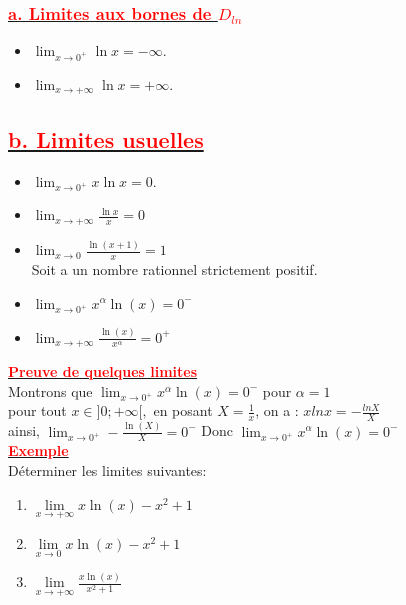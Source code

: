 \documentclass[12pt,a4paper]{article}
\begin{document}
\subsubsection*{\underline{\textbf{\textcolor{red}{a. Limites aux bornes de $D_{ln}$}}}}
\begin{itemize}
    \item $\lim_{x \to 0^+} \ln x = -\infty$.
    \item $\lim_{x \to +\infty} \ln x = +\infty$.
\end{itemize}
\subsection*{\underline{\textbf{\textcolor{red}{b. Limites usuelles}}}}
\begin{itemize}
    \item $\lim_{x \to 0^+} x \ln x = 0$.
    \item $ \lim_{x \to +\infty} \frac{\ln x}{x} = 0 $
    \item $\lim_{{x \to 0}} \frac{\ln(x+1)}{x}=1$\\
Soit a un nombre rationnel strictement positif.
   \item $\lim_{{x \to 0^+}} x^{\alpha}\ln(x) = 0^{-} $
   \item $\lim_{{x \to +\infty}} \frac{\ln(x)}{x^{\alpha}}=0^{+}$
\end{itemize}

\underline{\textbf{\textcolor{red}{Preuve de quelques limites}}}\\
Montrons que $\lim_{{x \to 0^+}} x^{\alpha}\ln(x) = 0^{-}$ pour $\alpha=1$\\
pour tout $x\in]0;+\infty[,$ en posant $X=\frac{1}{x}$, on a : $xlnx=-\frac{lnX}{X}$\\
ainsi, $\lim_{{x \to 0^{+}}} -\frac{\ln(X)}{X}=0^{-}$
Donc $\lim_{{x \to 0^+}} x^{\alpha}\ln(x) = 0^{-}$\\
\underline{\textbf{\textcolor{red}{Exemple}}}\\

Déterminer les limites suivantes:
\begin{enumerate}
\item \( \lim\limits_{x \to +\infty} x\ln(x)-x^{2}+1\)

\item \( \lim\limits_{x \to 0} x\ln(x)-x^{2}+1\)

\item \( \lim\limits_{x \to +\infty} \frac{x\ln(x)}{x^{2}+1}\)
\end{enumerate}
\end{document}
